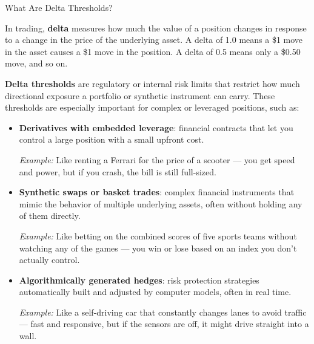 \begin{TechnicalSidebar}{What Are Delta Thresholds?}

  In trading, \textbf{delta} measures how much the value of a position changes in response to a change in the price 
  of the underlying asset.  
  A delta of 1.0 means a \$1 move in the asset causes a \$1 move in the position. A delta of 0.5 means only a \$0.50 
  move, and so on.

  \medskip

  \textbf{Delta thresholds} are regulatory or internal risk limits that restrict how much directional exposure a 
  portfolio or synthetic instrument can carry.  
  These thresholds are especially important for complex or leveraged positions, such as:

  \medskip

  \begin{itemize}
    \item \textbf{Derivatives with embedded leverage}: financial contracts that let you control a large position with a small upfront cost.  

    \medskip

    \textit{Example:} Like renting a Ferrari for the price of a scooter — you get speed and power, but if you crash, the bill is still full-sized.

    \medskip
  
    \item \textbf{Synthetic swaps or basket trades}: complex financial instruments that mimic the behavior of multiple underlying assets, often without holding any of them directly.  

    \medskip

    \textit{Example:} Like betting on the combined scores of five sports teams without watching any of the games — you win or lose based on an index you don’t actually control.

    \medskip
  
    \item \textbf{Algorithmically generated hedges}: risk protection strategies automatically built and adjusted by computer models, often in real time.  

    \medskip

    \textit{Example:} Like a self-driving car that constantly changes lanes to avoid traffic — fast and responsive, but if the sensors are off, it might drive straight into a wall.
  \end{itemize}
  

  \medskip


\end{TechnicalSidebar}
